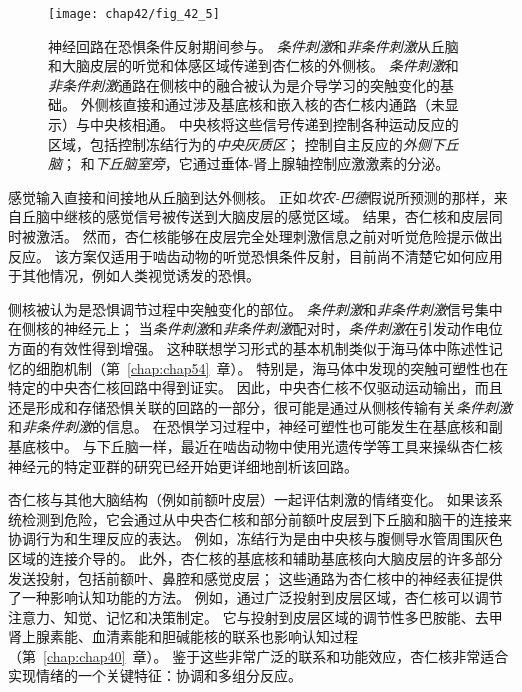 \begin{figure}[htbp]
	\centering
	\texttt{[image: chap42/fig\_42\_5]}
	\caption{神经回路在恐惧条件反射期间参与。
		\textit{条件刺激}和\textit{\textit{非条件刺激}}从丘脑和大脑皮层的听觉和体感区域传递到杏仁核的外侧核。
		\textit{条件刺激}和\textit{非条件刺激}通路在侧核中的融合被认为是介导学习的突触变化的基础。
		外侧核直接和通过涉及基底核和嵌入核的杏仁核内通路（未显示）与中央核相通。
		中央核将这些信号传递到控制各种运动反应的区域，包括控制冻结行为的\textit{中央灰质区}；
		控制自主反应的\textit{外侧下丘脑}；
		和\textit{下丘脑室旁}，它通过垂体-肾上腺轴控制应激激素的分泌\cite{medina2002parallels}。}
	\label{fig:42_5}
\end{figure}


感觉输入直接和间接地从丘脑到达外侧核。
正如\textit{坎农-巴德}假说所预测的那样，来自丘脑中继核的感觉信号被传送到大脑皮层的感觉区域。
结果，杏仁核和皮层同时被激活。
然而，杏仁核能够在皮层完全处理刺激信息之前对听觉危险提示做出反应。
该方案仅适用于啮齿动物的听觉恐惧条件反射，目前尚不清楚它如何应用于其他情况，例如人类视觉诱发的恐惧。


侧核被认为是恐惧调节过程中突触变化的部位。
\textit{条件刺激}和\textit{非条件刺激}信号集中在侧核的神经元上；
当\textit{条件刺激}和\textit{非条件刺激}配对时，\textit{条件刺激}在引发动作电位方面的有效性得到增强。
这种联想学习形式的基本机制类似于海马体中陈述性记忆的细胞机制（第~\ref{chap:chap54}~章）。
特别是，海马体中发现的突触可塑性也在特定的中央杏仁核回路中得到证实。
因此，中央杏仁核不仅驱动运动输出，而且还是形成和存储恐惧关联的回路的一部分，很可能是通过从侧核传输有关\textit{条件刺激}和\textit{非条件刺激}的信息。
在恐惧学习过程中，神经可塑性也可能发生在基底核和副基底核中。
与下丘脑一样，最近在啮齿动物中使用光遗传学等工具来操纵杏仁核神经元的特定亚群的研究已经开始更详细地剖析该回路。


杏仁核与其他大脑结构（例如前额叶皮层）一起评估刺激的情绪变化。
如果该系统检测到危险，它会通过从中央杏仁核和部分前额叶皮层到下丘脑和脑干的连接来协调行为和生理反应的表达。
例如，冻结行为是由中央核与腹侧导水管周围灰色区域的连接介导的。
此外，杏仁核的基底核和辅助基底核向大脑皮层的许多部分发送投射，包括前额叶、鼻腔和感觉皮层；
这些通路为杏仁核中的神经表征提供了一种影响认知功能的方法。
例如，通过广泛投射到皮层区域，杏仁核可以调节注意力、知觉、记忆和决策制定。
它与投射到皮层区域的调节性多巴胺能、去甲肾上腺素能、血清素能和胆碱能核的联系也影响认知过程（第~\ref{chap:chap40}~章）。
鉴于这些非常广泛的联系和功能效应，杏仁核非常适合实现情绪的一个关键特征：协调和多组分反应。



